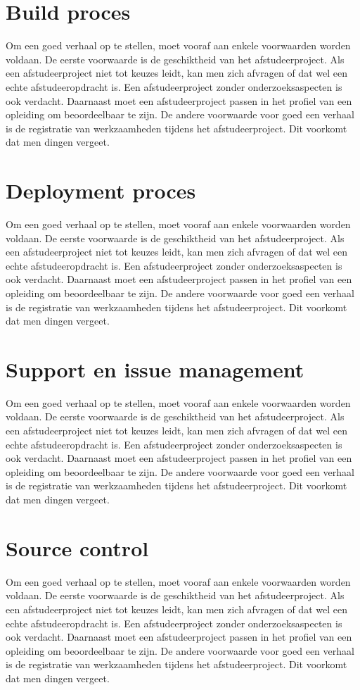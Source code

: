 		\section{Build proces}
		Om een goed verhaal op te stellen, moet vooraf aan enkele voorwaarden
		worden voldaan. De eerste voorwaarde is de geschiktheid van het
		afstudeerproject. Als een afstudeerproject niet tot keuzes leidt, kan
		men zich afvragen of dat wel een echte afstudeeropdracht is. Een
		afstudeerproject zonder onderzoeksaspecten is ook verdacht. Daarnaast
		moet een afstudeerproject passen in het profiel van een opleiding om
		beoordeelbaar te zijn. De andere voorwaarde voor goed een verhaal is
		de registratie van werkzaamheden tijdens het afstudeerproject. Dit
		voorkomt dat men dingen vergeet.
		\section{Deployment proces}
		Om een goed verhaal op te stellen, moet vooraf aan enkele voorwaarden
		worden voldaan. De eerste voorwaarde is de geschiktheid van het
		afstudeerproject. Als een afstudeerproject niet tot keuzes leidt, kan
		men zich afvragen of dat wel een echte afstudeeropdracht is. Een
		afstudeerproject zonder onderzoeksaspecten is ook verdacht. Daarnaast
		moet een afstudeerproject passen in het profiel van een opleiding om
		beoordeelbaar te zijn. De andere voorwaarde voor goed een verhaal is
		de registratie van werkzaamheden tijdens het afstudeerproject. Dit
		voorkomt dat men dingen vergeet.
		\section{Support en issue management}
		Om een goed verhaal op te stellen, moet vooraf aan enkele voorwaarden
		worden voldaan. De eerste voorwaarde is de geschiktheid van het
		afstudeerproject. Als een afstudeerproject niet tot keuzes leidt, kan
		men zich afvragen of dat wel een echte afstudeeropdracht is. Een
		afstudeerproject zonder onderzoeksaspecten is ook verdacht. Daarnaast
		moet een afstudeerproject passen in het profiel van een opleiding om
		beoordeelbaar te zijn. De andere voorwaarde voor goed een verhaal is
		de registratie van werkzaamheden tijdens het afstudeerproject. Dit
		voorkomt dat men dingen vergeet.
		\section{Source control}
		Om een goed verhaal op te stellen, moet vooraf aan enkele voorwaarden
		worden voldaan. De eerste voorwaarde is de geschiktheid van het
		afstudeerproject. Als een afstudeerproject niet tot keuzes leidt, kan
		men zich afvragen of dat wel een echte afstudeeropdracht is. Een
		afstudeerproject zonder onderzoeksaspecten is ook verdacht. Daarnaast
		moet een afstudeerproject passen in het profiel van een opleiding om
		beoordeelbaar te zijn. De andere voorwaarde voor goed een verhaal is
		de registratie van werkzaamheden tijdens het afstudeerproject. Dit
		voorkomt dat men dingen vergeet.
